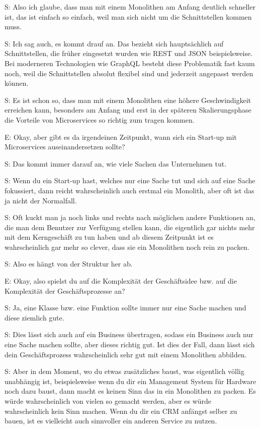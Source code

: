  \label{appendix:s-19}
S: Also ich glaube, dass man mit einem Monolithen am Anfang deutlich schneller ist, das ist einfach so einfach, weil man sich nicht um die Schnittstellen kommen muss.

 \label{appendix:s-20}
S: Ich sag auch, es kommt drauf an. Das bezieht sich hauptsächlich auf Schnittstellen, die früher eingesetzt wurden wie REST und JSON beispielsweise. Bei moderneren Technologien wie GraphQL besteht diese Problematik fast kaum noch, weil die Schnittstellen absolut flexibel sind und jederzeit angepasst werden können.

 \label{appendix:s-21}  \label{appendix:s-22}
S: Es ist schon so, dass man mit einem Monolithen eine höhere Geschwindigkeit erreichen kann, besonders am Anfang und erst in der späteren Skalierungsphase die Vorteile von Microservices so richtig zum tragen kommen.

E: Okay, aber gibt es da irgendeinen Zeitpunkt, wann sich ein Start-up mit Microservices auseinandersetzen sollte?

 \label{appendix:s-23}
S: Das kommt immer darauf an, wie viele Sachen das Unternehmen tut.

 \label{appendix:s-24}
S: Wenn du ein Start-up hast, welches nur eine Sache tut und sich auf eine Sache fokussiert, dann reicht wahrscheinlich auch erstmal ein Monolith, aber oft ist das ja nicht der Normalfall.

 \label{appendix:s-25}
S: Oft kuckt man ja noch links und rechts nach möglichen andere Funktionen an, die man dem Benutzer zur Verfügung stellen kann, die eigentlich gar nichts mehr mit dem Kerngeschäft zu tun haben und ab diesem Zeitpunkt ist es wahrscheinlich gar mehr so clever, dass sie ein Monolithen noch rein zu packen. 

S: Also es hängt von der Struktur her ab.

E: Okay, also spielst du auf die Komplexität der Geschäftsidee bzw. auf die Komplexität der Geschäftsprozesse an?

S: Ja, eine Klasse bzw. eine Funktion sollte immer nur eine Sache machen und diese ziemlich gute.

 \label{appendix:s-26}
S: Dies lässt sich auch auf ein Business übertragen, sodass ein Business auch nur eine Sache machen sollte, aber dieses richtig gut. Ist dies der Fall, dann lässt sich dein Geschäftsprozess wahrscheinlich sehr gut mit einem Monolithen abbilden.

 \label{appendix:s-27}
S: Aber in dem Moment, wo du etwas zusätzliches baust, was eigentlich völlig unabhängig ist, beispielsweise wenn du dir ein Management System für Hardware noch dazu baust, dann macht es keinen Sinn das in ein Monolithen zu packen. Es würde wahrscheinlich von vielen so gemacht werden, aber es würde  wahrscheinlich kein Sinn machen. Wenn du dir ein CRM anfängst selber zu bauen, ist es vielleicht auch sinnvoller ein anderen Service zu nutzen.

